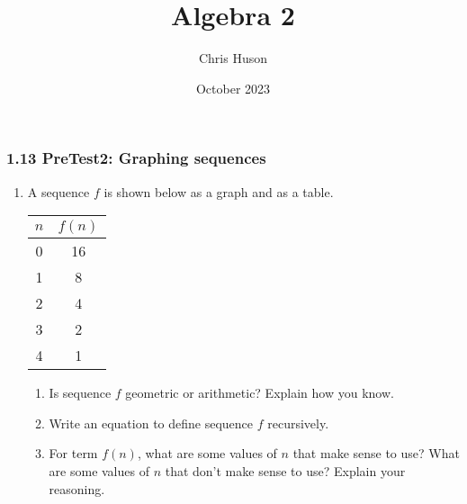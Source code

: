 \documentclass[12pt, twoside]{article}
\title{Algebra 2}
\author{Chris Huson}
\date{October 2023}
\begin{document}
\subsubsection*{1.13 PreTest2: Graphing sequences}
\begin{enumerate}

\item A sequence $f$ is shown below as a graph and as a table.
\begin{multicols}{2}
\begin{center}
    \end{center}
    \begin{tabular}{c|c}
        $n$ & $f(n)$ \\ \hline
        0 & 16 \\ 
        1 & 8 \\ 
        2 & 4 \\ 
        3 & 2 \\ 
        4 & 1 \\ 
        \end{tabular}
    \end{multicols}
    \begin{enumerate}
        \item Is sequence $f$ geometric or arithmetic? Explain how you know. \vspace{2cm}
        \item Write an equation to define sequence $f$ recursively. \vspace{3cm}
        \item For term $f(n)$, what are some values of $n$ that make sense to use? What are some values of $n$ that don't make sense to use? Explain your reasoning.
    \end{enumerate}


\end{enumerate}
\end{document}
